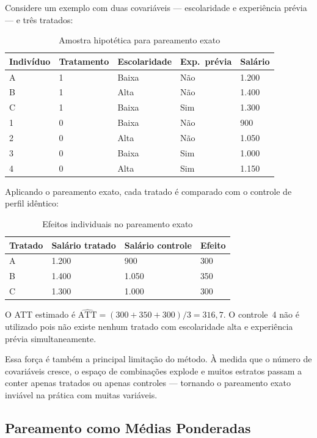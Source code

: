 \documentclass[12pt,a4paper]{article}
\begin{document}
Considere um exemplo com duas covariáveis --- escolaridade e experiência prévia --- e três tratados:

\begin{table}[H]
\centering
\caption{Amostra hipotética para pareamento exato}\label{tab:exato1}
\begin{tabular}{lllll}
\toprule
Indivíduo & Tratamento & Escolaridade & Exp.\ prévia & Salário \\
\midrule
A & 1 & Baixa & Não & 1.200 \\
B & 1 & Alta  & Não & 1.400 \\
C & 1 & Baixa & Sim & 1.300 \\
1 & 0 & Baixa & Não & 900   \\
2 & 0 & Alta  & Não & 1.050 \\
3 & 0 & Baixa & Sim & 1.000 \\
4 & 0 & Alta  & Sim & 1.150 \\
\bottomrule
\end{tabular}
\end{table}

Aplicando o pareamento exato, cada tratado é comparado com o controle de perfil idêntico:

\begin{table}[H]
\centering
\caption{Efeitos individuais no pareamento exato}\label{tab:exato2}
\begin{tabular}{llll}
\toprule
Tratado & Salário tratado & Salário controle & Efeito \\
\midrule
A & 1.200 & 900   & 300 \\
B & 1.400 & 1.050 & 350 \\
C & 1.300 & 1.000 & 300 \\
\bottomrule
\end{tabular}
\end{table}

O ATT estimado é $\widehat{\text{ATT}} = (300 + 350 + 300)/3 = 316{,}7$. O controle~4 não é utilizado pois não existe nenhum tratado com escolaridade alta e experiência prévia simultaneamente.

Essa força é também a principal limitação do método. À medida que o número de covariáveis cresce, o espaço de combinações explode e muitos estratos passam a conter apenas tratados ou apenas controles --- tornando o pareamento exato inviável na prática com muitas variáveis.

\subsection{Pareamento como Médias Ponderadas}
\end{document}
